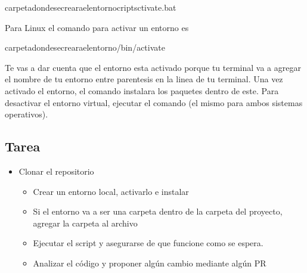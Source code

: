 \documentclass[a5paper,9pt,spanish]{sphinxmanual}
\begin{document}
\begin{sphinxVerbatim}[commandchars=\\\{\}]
\PYGZlt{}carpeta\PYGZus{}donde\PYGZus{}se\PYGZus{}creara\PYGZus{}el\PYGZus{}entorno\PYGZgt{}criptsctivate.bat
\end{sphinxVerbatim}

\sphinxAtStartPar
Para Linux el comando para activar un entorno es

\begin{sphinxVerbatim}[commandchars=\\\{\}]
 \PYGZlt{}carpeta\PYGZus{}donde\PYGZus{}se\PYGZus{}creara\PYGZus{}el\PYGZus{}entorno\PYGZgt{}/bin/activate
\end{sphinxVerbatim}

\sphinxAtStartPar
Te vas a dar cuenta que el entorno esta activado porque tu terminal va a agregar
el nombre de tu entorno entre parentesis en la linea de tu terminal.
Una vez activado el entorno, el comando  instalara los paquetes dentro de este.
Para desactivar el entorno virtual, ejecutar el comando  (el mismo para
ambos sistemas operativos).


\subsection{Tarea}
\label{\detokenize{external-packages:tarea}}\begin{itemize}
\item {} 
\sphinxAtStartPar
Clonar el repositorio %
\begin{footnote}[34]\sphinxAtStartFootnote
{}
%
\end{footnote}
\begin{itemize}
\item {} 
\sphinxAtStartPar
Crear un entorno local, activarlo e instalar 

\item {} 
\sphinxAtStartPar
Si el entorno va a ser una carpeta dentro de la carpeta del proyecto, agregar la
carpeta al archivo 

\item {} 
\sphinxAtStartPar
Ejecutar el script  y asegurarse de que funcione como se espera.

\item {} 
\sphinxAtStartPar
Analizar el código y proponer algún cambio mediante algún PR

\end{itemize}

\end{itemize}
\end{document}
